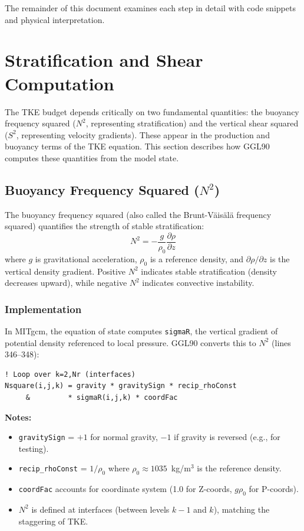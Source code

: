\documentclass[12pt,letterpaper]{article}
\begin{document}
The remainder of this document examines each step in detail with code snippets
and physical interpretation.

\section{Stratification and Shear Computation}
\label{sec:stratification}

The TKE budget depends critically on two fundamental quantities: the buoyancy
frequency squared ($N^2$, representing stratification) and the vertical shear
squared ($S^2$, representing velocity gradients). These appear in the
production and buoyancy terms of the TKE equation. This section describes how
GGL90 computes these quantities from the model state.

\subsection{Buoyancy Frequency Squared ($N^2$)}

The buoyancy frequency squared (also called the Brunt-V\"ais\"al\"a frequency
squared) quantifies the strength of stable stratification:
\[
N^2 = -\frac{g}{\rho_0} \frac{\partial \rho}{\partial z}
\]
where $g$ is gravitational acceleration, $\rho_0$ is a reference density, and
$\partial \rho / \partial z$ is the vertical density gradient. Positive $N^2$
indicates stable stratification (density decreases upward), while negative
$N^2$ indicates convective instability.

\subsubsection{Implementation}

In MITgcm, the equation of state computes \texttt{sigmaR}, the vertical
gradient of potential density referenced to local pressure. GGL90 converts
this to $N^2$ (lines 346--348):

\begin{lstlisting}[caption={\texttt{ggl90\_calc.F}, lines 346--348 -- Buoyancy frequency squared.}]
! Loop over k=2,Nr (interfaces)
Nsquare(i,j,k) = gravity * gravitySign * recip_rhoConst
     &         * sigmaR(i,j,k) * coordFac
\end{lstlisting}

\textbf{Notes:}
\begin{itemize}[leftmargin=*]
  \item \texttt{gravitySign} = $+1$ for normal gravity, $-1$ if gravity is
        reversed (e.g., for testing).
  \item \texttt{recip\_rhoConst} = $1/\rho_0$ where $\rho_0 \approx 1035$~kg/m$^3$
        is the reference density.
  \item \texttt{coordFac} accounts for coordinate system (1.0 for Z-coords,
        $g\rho_0$ for P-coords).
  \item $N^2$ is defined at interfaces (between levels $k-1$ and $k$), matching
        the staggering of TKE.
\end{itemize}
\end{document}
